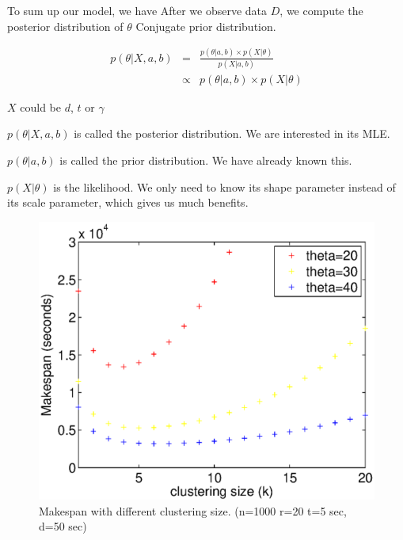 \documentclass{IOS-Book-Article}
\begin{document}
To sum up our model, we have
After we observe data $D$, we compute the posterior distribution of $\theta$
Conjugate prior distribution. 

\begin{eqnarray}
	\displaystyle  
	p(\theta|X, a, b)&=&\frac{p(\theta|a, b)\times p(X|\theta)}{p(X|a, b)}\nonumber  \\
	&\propto&p(\theta|a, b)\times p(X|\theta)\nonumber 
\end{eqnarray}

$X$ could be $d$, $t$ or $\gamma$ 

$p(\theta|X,a, b)$ is called the posterior distribution. We are interested in its MLE. 

$p(\theta|a, b)$ is called the prior distribution. We have already known this. 

$p(X|\theta)$ is the likelihood. We only need to know its shape parameter instead of its scale parameter, which gives us much benefits. 

\begin{figure}[!htb]
\centering
  \includegraphics[width=0.95\linewidth]{figure5.eps}
  \caption{Makespan with different clustering size. (n=1000 r=20 t=5 sec, d=50 sec)}
  \label{fig:model_makespan}
\end{figure}
\end{document}
